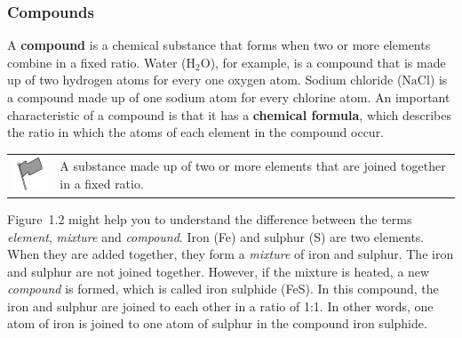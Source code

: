 	\par
      \label{m38708*uid26}
            \subsubsection{ Compounds}
            \nopagebreak
        \label{m38708*id63363}A \textbf{compound} is a chemical substance that forms when two or more elements combine in a fixed ratio. Water ($\mathrm{H}{}_{2}\mathrm{O}$), for example, is a compound that is made up of two hydrogen atoms for every one oxygen atom. Sodium chloride ($\mathrm{NaCl}$) is a compound made up of one sodium atom for every chlorine atom. An important characteristic of a compound is that it has a \textbf{chemical formula}, which describes the ratio in which the atoms of each element in the compound occur.\par 
\label{m38708*fhsst!!!underscore!!!id201}\begin{definition}
	  \begin{tabular*}{15 cm}{m{15 mm}m{}}
	\hspace*{-50pt}  \includegraphics[width=0.5in]{col11305.imgs/psflag2.png}   & \Definition{   \label{id2406453}\textbf{ Compound }} { \label{m38708*meaningfhsst!!!underscore!!!id201}
        A substance made up of two or more elements that are joined together in a fixed ratio.
         } 
      \end{tabular*}
      \end{definition}
        \label{m38708*id63410}Figure~1.2 might help you to understand the difference between the terms \textsl{element}, \textsl{mixture} and \textsl{compound}. Iron (Fe) and sulphur (S) are two elements. When they are added together, they form a \textsl{mixture} of iron and sulphur. The iron and sulphur are not joined together. However, if the mixture is heated, a new \textsl{compound} is formed, which is called iron sulphide (FeS). In this compound, the iron and sulphur are joined to each other in a ratio of 1:1. In other words, one atom of iron is joined to one atom of sulphur in the compound iron sulphide.\par 
    \setcounter{subfigure}{0}

